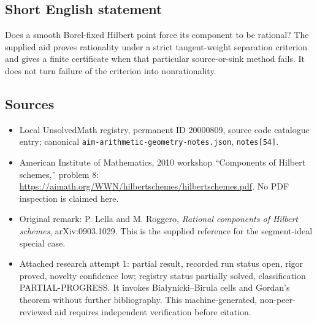 \documentclass[11pt]{article}
\begin{document}
\subsection{Short English statement}
Does a smooth Borel-fixed Hilbert point force its component to be rational? The supplied aid proves rationality under a strict tangent-weight separation criterion and gives a finite certificate when that particular source-or-sink method fails. It does not turn failure of the criterion into nonrationality.
\subsection{Sources}
\begin{itemize}
\item Local UnsolvedMath registry, permanent ID $20000809$, source code catalogue entry; canonical \texttt{aim-arithmetic-geometry-notes.json}, \texttt{notes[54]}.
\item American Institute of Mathematics, 2010 workshop ``Components of Hilbert schemes,'' problem 8: \url{https://aimath.org/WWN/hilbertschemes/hilbertschemes.pdf}. No PDF inspection is claimed here.
\item Original remark: P. Lella and M. Roggero, \emph{Rational components of Hilbert schemes}, arXiv:0903.1029. This is the supplied reference for the segment-ideal special case.
\item Attached research attempt 1: partial result, recorded run status open, rigor proved, novelty confidence low; registry status partially solved, classification PARTIAL-PROGRESS. It invokes Bia\l ynicki--Birula cells and Gordan's theorem without further bibliography. This machine-generated, non-peer-reviewed aid requires independent verification before citation.
\end{itemize}
\end{document}
